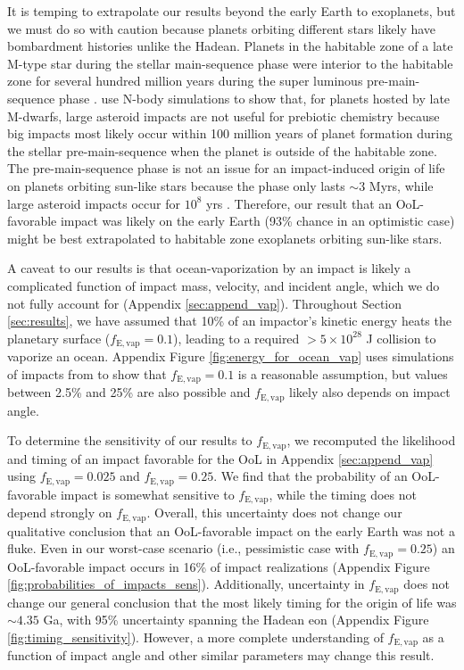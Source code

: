 \documentclass{Liebert_Author}
\begin{document}
It is temping to extrapolate our results beyond the early Earth to exoplanets, but we must do so with caution because planets orbiting different stars likely have bombardment histories unlike the Hadean. Planets in the habitable zone of a late M-type star during the stellar main-sequence phase were interior to the habitable zone for several hundred million years during the super luminous pre-main-sequence phase \citep{Luger_2015}. \citet{Lichtenberg_2022} use N-body simulations to show that, for planets hosted by late M-dwarfs, large asteroid impacts are not useful for prebiotic chemistry because big impacts most likely occur within 100 million years of planet formation during the stellar pre-main-sequence when the planet is outside of the habitable zone. The pre-main-sequence phase is not an issue for an impact-induced origin of life on planets orbiting sun-like stars because the phase only lasts $\sim 3$ Myrs, while large asteroid impacts occur for $10^8$ yrs \citep{Lichtenberg_2022}. Therefore, our result that an OoL-favorable impact was likely on the early Earth (93\% chance in an optimistic case) might be best extrapolated to habitable zone exoplanets orbiting sun-like stars.

A caveat to our results is that ocean-vaporization by an impact is likely a complicated function of impact mass, velocity, and incident angle, which we do not fully account for (Appendix \ref{sec:append_vap}). Throughout Section \ref{sec:results}, we have assumed that 10\% of an impactor's kinetic energy heats the planetary surface ($f_\mathrm{E,vap} = 0.1$), leading to a required $> 5 \times 10^{28}$ J collision to vaporize an ocean. Appendix Figure \ref{fig:energy_for_ocean_vap} uses simulations of impacts from \citet{Citron_2022} to show that $f_\mathrm{E,vap} = 0.1$ is a reasonable assumption, but values between 2.5\% and 25\% are also possible and $f_\mathrm{E,vap}$ likely also depends on impact angle.

To determine the sensitivity of our results to $f_\mathrm{E,vap}$, we recomputed the likelihood and timing of an impact favorable for the OoL in Appendix \ref{sec:append_vap} using $f_\mathrm{E,vap} = 0.025$ and $f_\mathrm{E,vap} = 0.25$. We find that the probability of an OoL-favorable impact is somewhat sensitive to $f_\mathrm{E,vap}$, while the timing does not depend strongly on $f_\mathrm{E,vap}$. Overall, this uncertainty does not change our qualitative conclusion that an OoL-favorable impact on the early Earth was not a fluke. Even in our worst-case scenario (i.e., \citet{Wogan_2023} pessimistic case with $f_\mathrm{E,vap} = 0.25$) an OoL-favorable impact occurs in 16\% of impact realizations (Appendix Figure \ref{fig:probabilities_of_impacts_sens}). Additionally, uncertainty in $f_\mathrm{E,vap}$ does not change our general conclusion that the most likely timing for the origin of life was $\sim 4.35$ Ga, with 95\% uncertainty spanning the Hadean eon (Appendix Figure \ref{fig:timing_sensitivity}). However, a more complete understanding of $f_\mathrm{E,vap}$ as a function of impact angle and other similar parameters may change this result.
\end{document}

